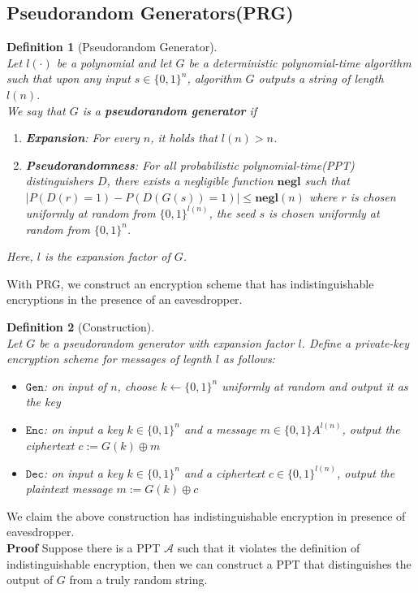 \documentclass[12pt]{article}
\newtheorem{definition}{Definition}[section]
\theoremstyle{definition}
\begin{document}
\subsection{Pseudorandom Generators(PRG)}
\begin{definition}[Pseudorandom Generator]
\hfill\\\normalfont Let $l(\cdot)$ be a polynomial and let $G$ be a deterministic polynomial-time algorithm such that upon any input $s\in\{0,1\}^n$, algorithm $G$ outputs a string of length $l(n)$.\\

We say that $G$ is a \textbf{pseudorandom generator} if
\begin{enumerate}
 \item \textbf{Expansion}: For every $n$, it holds that $l(n)>n$.
 \item \textbf{Pseudorandomness}: For all probabilistic polynomial-time(PPT) distinguishers $D$, there exists a negligible function $\mathbf{negl}$ such that
 $
|P(D(r)=1)-P(D(G(s))=1)|\leq \mathbf{negl}(n)
 $
where $r$ is chosen uniformly at random from $\{0,1\}^{l(n)}$, the seed $s$ is chosen uniformly at random from $\{0,1\}^n$.
\end{enumerate}
Here, $l$ is the expansion factor of $G$.
\end{definition}
With PRG, we construct an encryption scheme that has indistinguishable encryptions in the presence of an eavesdropper. 
\begin{definition}[Construction]
\hfill\\\normalfont Let $G$ be a pseudorandom generator with expansion factor $l$. Define a private-key encryption scheme for messages of legnth $l$ as follows:
\begin{itemize}
  \item $\texttt{Gen}$: on input of $n$, choose $k\leftarrow \{0,1\}^n$ uniformly at random and output it as the key
  \item $\texttt{Enc}$: on input a key $k\in\{0,1\}^n$ and a message $m\in\{0,1\}A^{l(n)}$, output the ciphertext
  $
c:=G(k)\oplus m
  $
  \item $\texttt{Dec}$: on input a key $k\in\{0,1\}^n$ and a ciphertext $c\in\{0,1\}^{l(n)}$, output the plaintext message
$
m:=G(k)\oplus c
$
\end{itemize}
\end{definition}
We claim the above construction has indistinguishable encryption in presence of eavesdropper.\\
\textbf{Proof}
Suppose there is a PPT $\mathcal{A}$ such that it violates the definition of indistinguishable encryption, then we can construct a PPT that distinguishes the output of $G$ from a truly random string. \\
\end{document}
